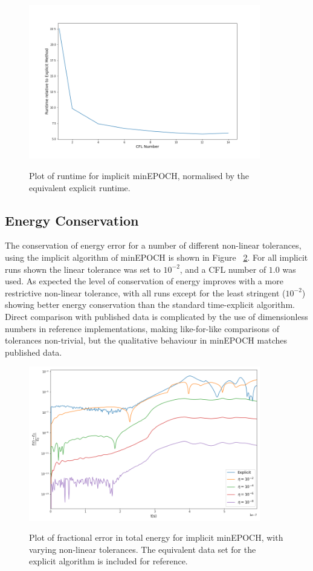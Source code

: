 \documentclass{article}
\begin{document}
\begin{figure}[h]
  \caption{Plot of runtime for implicit minEPOCH, normalised by the equivalent explicit runtime.}
  \centering
  \includegraphics[width=0.9\textwidth]{CFL.png}
  \label{fig:CFL}
\end{figure}

\subsection{Energy Conservation}

The conservation of energy error for a number of different non-linear tolerances, using the implicit algorithm of minEPOCH is shown in Figure ~\ref{fig:energy}. For all implicit runs shown the linear tolerance was set to $10^{-2}$, and a CFL number of $1.0$ was used. As expected the level of conservation of energy improves with a more restrictive non-linear tolerance, with all runs except for the least stringent ($10^{-2}$) showing better energy conservation than the standard time-explicit algorithm. Direct comparison with published data is complicated by the use of dimensionless numbers in reference implementations, making like-for-like comparisons of tolerances non-trivial, but the qualitative behaviour in minEPOCH matches published data.

\begin{figure}[h]
  \caption{Plot of fractional error in total energy for implicit minEPOCH, with varying non-linear tolerances. The equivalent data set for the explicit algorithm is included for reference.}
  \centering
  \includegraphics[width=0.9\textwidth]{energy.png}
  \label{fig:energy}
\end{figure}
\end{document}
